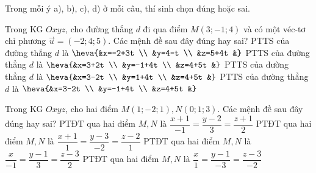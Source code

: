 \TNTF
Trong mỗi ý a), b), c), d) ở mỗi câu, thí sinh chọn đúng hoặc sai.
\begin{ex}%
	Trong KG $Oxyz$, cho đường thẳng $d$ đi qua điểm $M(3;-1; 4)$ và có một véc-tơ  chỉ phương $\overrightarrow{u}=(-2; 4; 5)$. Các mệnh đề sau đây đúng hay sai?
	\choiceTF
	{PTTS của đường thẳng $d$ là $\heva{&x=-2+3t \\
			&y=4-t \\
			&z=5+4t
			&}$}
	{PTTS của đường thẳng $d$ là $\heva{&x=3+2t \\
			&y=-1+4t \\
			&z=4+5t
			&}$}
	{PTTS của đường thẳng $d$ là $\heva{&x=3-2t \\
			&y=1+4t \\
			&z=4+5t
			&}$}
	{\True PTTS của đường thẳng $d$ là $\heva{&x=3-2t \\
			&y=-1+4t \\
			&z=4+5t
			&}$}
\end{ex}
\begin{ex}%
	Trong KG $Oxyz$, cho hai điểm $M(1;-2; 1), N(0; 1; 3)$. Các mệnh đề sau đây đúng hay sai?
	\choiceTF
	{PTĐT qua hai điểm $M, N$ là $\dfrac{x+1}{-1}=\dfrac{y-2}{3}=\dfrac{z+1}{2}$}
	{PTĐT qua hai điểm $M, N$ là $\dfrac{x+1}{1}=\dfrac{y-3}{-2}=\dfrac{z-2}{1}$}
	{\True PTĐT qua hai điểm $M, N$ là $\dfrac{x}{-1}=\dfrac{y-1}{3}=\dfrac{z-3}{2}$}
	{\True PTĐT qua hai điểm $M, N$ là $\dfrac{x}{1}=\dfrac{y-1}{-3}=\dfrac{z-3}{-2}$}
\end{ex}
